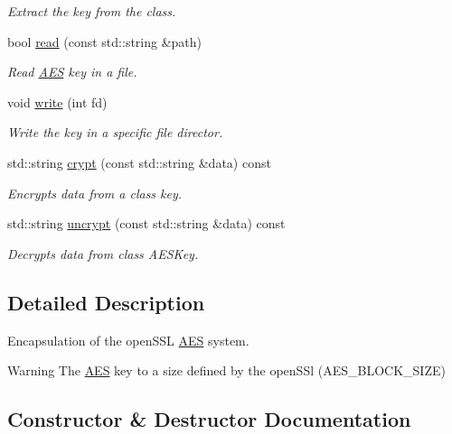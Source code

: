 \begin{DoxyCompactItemize}
\begin{DoxyCompactList}\small\item\em Extract the key from the class. \end{DoxyCompactList}\item 
bool \hyperlink{class_spider_1_1ssl_1_1_a_e_s_a9ed853ba70dba93ed28523a9dcd52d72}{read} (const std\+::string \&path)
\begin{DoxyCompactList}\small\item\em Read \hyperlink{class_spider_1_1ssl_1_1_a_e_s}{A\+ES} key in a file. \end{DoxyCompactList}\item 
void \hyperlink{class_spider_1_1ssl_1_1_a_e_s_ac4c9691e1fd1c250343ebe8206f26026}{write} (int fd)
\begin{DoxyCompactList}\small\item\em Write the key in a specific file director. \end{DoxyCompactList}\item 
std\+::string \hyperlink{class_spider_1_1ssl_1_1_a_e_s_a035de929280e43fed57eb5bbadab394f}{crypt} (const std\+::string \&data) const
\begin{DoxyCompactList}\small\item\em Encrypts data from a class key. \end{DoxyCompactList}\item 
std\+::string \hyperlink{class_spider_1_1ssl_1_1_a_e_s_a187c229df6c9e59b44c6148f5eac6177}{uncrypt} (const std\+::string \&data) const
\begin{DoxyCompactList}\small\item\em Decrypts data from class A\+E\+S\+Key. \end{DoxyCompactList}\end{DoxyCompactItemize}


\subsection{Detailed Description}
Encapsulation of the open\+S\+SL \hyperlink{class_spider_1_1ssl_1_1_a_e_s}{A\+ES} system. 

\begin{DoxyWarning}{Warning}
The \hyperlink{class_spider_1_1ssl_1_1_a_e_s}{A\+ES} key to a size defined by the open\+S\+Sl (A\+E\+S\+\_\+\+B\+L\+O\+C\+K\+\_\+\+S\+I\+ZE) 
\end{DoxyWarning}


\subsection{Constructor \& Destructor Documentation}
\mbox{\label{class_spider_1_1ssl_1_1_a_e_s_a9da7fa808bebcdb3042322a371473069}} 
